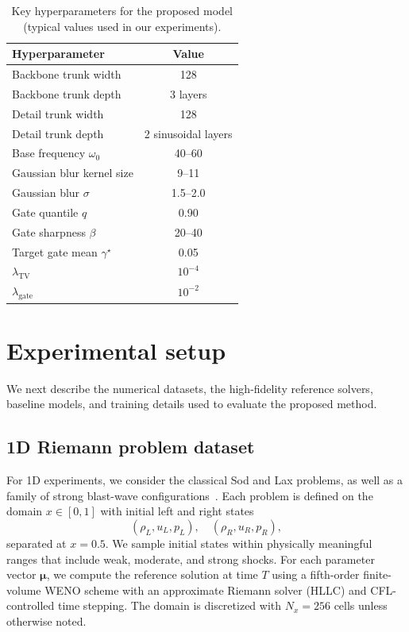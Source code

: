 \documentclass[a4paper,fleqn]{cas-dc}
\begin{document}
\begin{table}[t]
\caption{Key hyperparameters for the proposed model (typical values used in our experiments).}
\label{tab:hyperparams}
\begin{tabular*}{\tblwidth}{@{}lc@{}}
\toprule
Hyperparameter & Value \\
\midrule
Backbone trunk width & 128 \\
Backbone trunk depth & 3 layers \\
Detail trunk width & 128 \\
Detail trunk depth & 2 sinusoidal layers \\
Base frequency $\omega_0$ & 40--60 \\
Gaussian blur kernel size & 9--11 \\
Gaussian blur $\sigma$ & 1.5--2.0 \\
Gate quantile $q$ & 0.90 \\
Gate sharpness $\beta$ & 20--40 \\
Target gate mean $\gamma^\star$ & 0.05 \\
$\lambda_{\mathrm{TV}}$ & $10^{-4}$ \\
$\lambda_{\mathrm{gate}}$ & $10^{-2}$ \\
\bottomrule
\end{tabular*}
\end{table}

\section{Experimental setup}
\label{sec:experiments}

We next describe the numerical datasets, the high-fidelity reference solvers, baseline models, and training details used to evaluate the proposed method.

\subsection{1D Riemann problem dataset}

For 1D experiments, we consider the classical Sod and Lax problems, as well as a family of strong blast-wave configurations~\citep{Sod1978JCP,Toro1999Riemann}.
Each problem is defined on the domain $x\in[0,1]$ with initial left and right states
\begin{equation}
  (\rho_L, u_L, p_L),\quad
  (\rho_R, u_R, p_R),
\end{equation}
separated at $x=0.5$.
We sample initial states within physically meaningful ranges that include weak, moderate, and strong shocks.
For each parameter vector $\boldsymbol{\mu}$, we compute the reference solution at time $T$ using a fifth-order finite-volume WENO scheme with an approximate Riemann solver (HLLC) and CFL-controlled time stepping.
The domain is discretized with $N_x=256$ cells unless otherwise noted.
\end{document}
